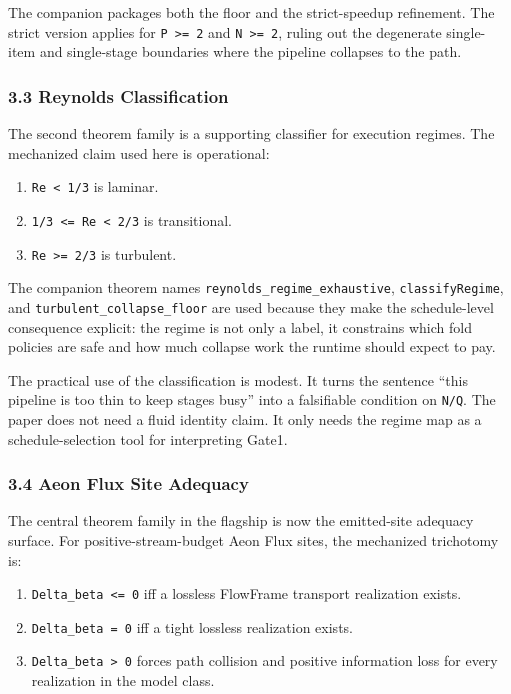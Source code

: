 \documentclass[
  11pt,
]{article}
\providecommand{\tightlist}{%
  \setlength{\itemsep}{0pt}\setlength{\parskip}{0pt}}
\begin{document}
The companion packages both the floor and the strict-speedup refinement.
The strict version applies for \texttt{P\ \textgreater{}=\ 2} and
\texttt{N\ \textgreater{}=\ 2}, ruling out the degenerate single-item
and single-stage boundaries where the pipeline collapses to the path.

\subsubsection{3.3 Reynolds
Classification}\label{reynolds-classification}

The second theorem family is a supporting classifier for execution
regimes. The mechanized claim used here is operational:

\begin{enumerate}
\def\labelenumi{\arabic{enumi}.}
\tightlist
\item
  \texttt{Re\ \textless{}\ 1/3} is laminar.
\item
  \texttt{1/3\ \textless{}=\ Re\ \textless{}\ 2/3} is transitional.
\item
  \texttt{Re\ \textgreater{}=\ 2/3} is turbulent.
\end{enumerate}

The companion theorem names \texttt{reynolds\_regime\_exhaustive},
\texttt{classifyRegime}, and \texttt{turbulent\_collapse\_floor} are
used because they make the schedule-level consequence explicit: the
regime is not only a label, it constrains which fold policies are safe
and how much collapse work the runtime should expect to pay.

The practical use of the classification is modest. It turns the sentence
``this pipeline is too thin to keep stages busy'' into a falsifiable
condition on \texttt{N/Q}. The paper does not need a fluid identity
claim. It only needs the regime map as a schedule-selection tool for
interpreting Gate1.

\subsubsection{3.4 Aeon Flux Site
Adequacy}\label{aeon-flux-site-adequacy}

The central theorem family in the flagship is now the emitted-site
adequacy surface. For positive-stream-budget Aeon Flux sites, the
mechanized trichotomy is:

\begin{enumerate}
\def\labelenumi{\arabic{enumi}.}
\tightlist
\item
  \texttt{Delta\_beta\ \textless{}=\ 0} iff a lossless FlowFrame
  transport realization exists.
\item
  \texttt{Delta\_beta\ =\ 0} iff a tight lossless realization exists.
\item
  \texttt{Delta\_beta\ \textgreater{}\ 0} forces path collision and
  positive information loss for every realization in the model class.
\end{enumerate}
\end{document}
